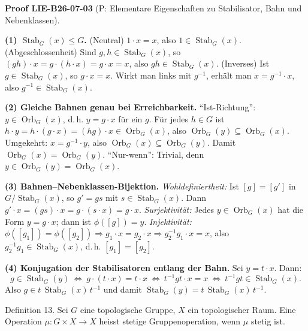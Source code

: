 \documentclass[10pt, letterpaper]{article}
\newcommand{\CustomHeading}[3]{%
  \par\medskip\noindent%
  \textbf{#1 #2} \textnormal{(#3)}.\enskip%
}
\newenvironment{PROOF}[2]{\begin{unitbox}\CustomHeading{Proof}{#1}{#2}}{\end{unitbox}}
\begin{document}
\begin{PROOF}{LIE-B26-07-03}{P: Elementare Eigenschaften zu Stabilisator, Bahn und Nebenklassen}
\textbf{(1) $\operatorname{Stab}_G(x)\le G$.}
(Neutral) $1\cdot x=x$, also $1\in\operatorname{Stab}_G(x)$. 
(Abgeschlossenheit) Sind $g,h\in\operatorname{Stab}_G(x)$, so $(gh)\cdot x=g\cdot(h\cdot x)=g\cdot x=x$, also $gh\in\operatorname{Stab}_G(x)$.
(Inverses) Ist $g\in\operatorname{Stab}_G(x)$, so $g\cdot x=x$. Wirkt man links mit $g^{-1}$, erhält man $x=g^{-1}\cdot x$, also $g^{-1}\in\operatorname{Stab}_G(x)$.

\smallskip
\textbf{(2) Gleiche Bahnen genau bei Erreichbarkeit.}
“Ist-Richtung”: $y\in\operatorname{Orb}_G(x)$, d.\,h. $y=g\cdot x$ für ein $g$. Für jedes $h\in G$ ist $h\cdot y=h\cdot(g\cdot x)=(hg)\cdot x\in\operatorname{Orb}_G(x)$, also $\operatorname{Orb}_G(y)\subseteq\operatorname{Orb}_G(x)$. Umgekehrt: $x=g^{-1}\cdot y$, also $\operatorname{Orb}_G(x)\subseteq\operatorname{Orb}_G(y)$. Damit $\operatorname{Orb}_G(x)=\operatorname{Orb}_G(y)$.
“Nur-wenn”: Trivial, denn $y\in\operatorname{Orb}_G(y)=\operatorname{Orb}_G(x)$.

\smallskip
\textbf{(3) Bahnen–Nebenklassen-Bijektion.}
\emph{Wohldefiniertheit:} Ist $[g]=[g']$ in $G/\operatorname{Stab}_G(x)$, so $g'=g s$ mit $s\in\operatorname{Stab}_G(x)$. Dann $g'\cdot x=(g s)\cdot x=g\cdot(s\cdot x)=g\cdot x$.
\emph{Surjektivität:} Jedes $y\in\operatorname{Orb}_G(x)$ hat die Form $y=g\cdot x$; dann ist $\phi([g])=y$.
\emph{Injektivität:} $\phi([g_1])=\phi([g_2])\Rightarrow g_1\cdot x=g_2\cdot x\Rightarrow g_2^{-1}g_1\cdot x=x$, also $g_2^{-1}g_1\in\operatorname{Stab}_G(x)$, d.\,h. $[g_1]=[g_2]$.

\smallskip
\textbf{(4) Konjugation der Stabilisatoren entlang der Bahn.}
Sei $y=t\cdot x$. Dann:
\[
g\in\operatorname{Stab}_G(y)
\ \Longleftrightarrow\ 
g\cdot (t\cdot x)=t\cdot x
\ \Longleftrightarrow\ 
t^{-1} g t \cdot x = x
\ \Longleftrightarrow\
t^{-1} g t \in \operatorname{Stab}_G(x).
\]
Also $g\in t\,\operatorname{Stab}_G(x)\,t^{-1}$ und damit $\operatorname{Stab}_G(y)=t\,\operatorname{Stab}_G(x)\,t^{-1}$.
\end{PROOF}




Definition 13. Sei $G$ eine topologische Gruppe, $X$ ein topologischer Raum. Eine Operation $\mu: G \times X \rightarrow X$ heisst stetige Gruppenoperation, wenn $\mu$ stetig ist.
\end{document}
